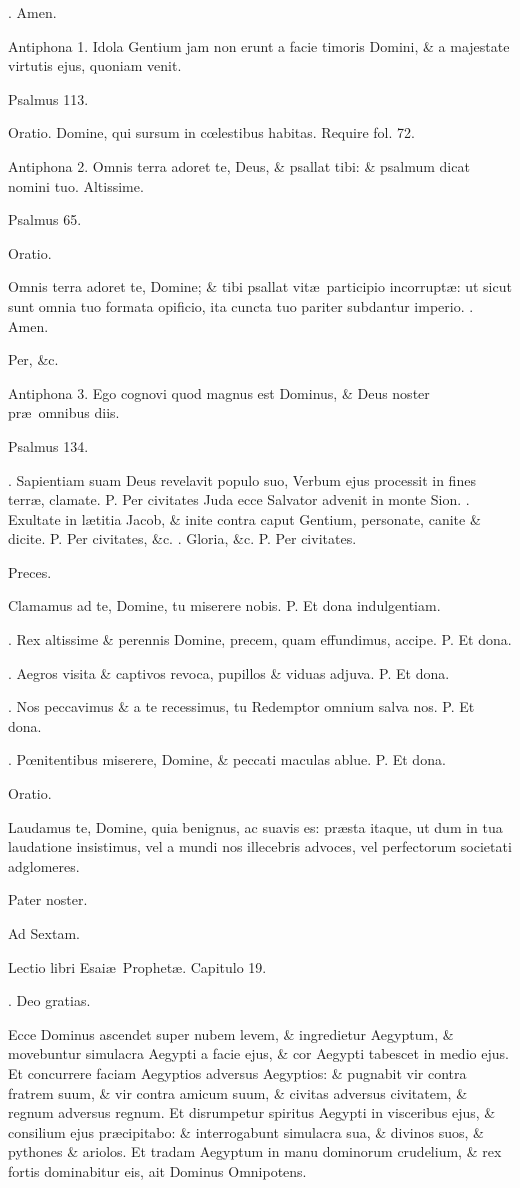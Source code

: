 \documentclass[letter,11pt]{book}
\makeatletter
\DeclareRobustCommand{\Vbar}{\vers@resp{-0.1em}{V}}
\DeclareRobustCommand{\Rbar}{\vers@resp{0pt}{R}}
\newcommand{\vers@resp@sym}{\raisebox{0.2ex}{\rotatebox[origin=c]{-20}{$\m@th\rceil$}}}
\newcommand{\vers@resp}[2]{%
  {\ooalign{\hidewidth\kern#1\vers@resp@sym\hidewidth\cr#2\cr}}%
}%
\def\P{\color{Red} P. \color{black}}
\def\V{\color{Red} \Vbar . \color{black}}
\def\R{\color{Red} \Rbar . \color{black}}
\makeatother
\begin{document}
\begin{multicols*}{2}
\R Amen.

Antiphona 1. Idola Gentium jam non erunt a facie timoris Domini, \& a majestate virtutis ejus, quoniam venit.

Psalmus 113.

Oratio. Domine, qui sursum in c\oe lestibus habitas. Require fol. 72.

Antiphona 2. Omnis terra adoret te, Deus, \& psallat tibi: \& psalmum dicat nomini tuo. Altissime.

Psalmus 65.

Oratio.

Omnis terra adoret te, Domine; \& tibi psallat vit\ae \ participio incorrupt\ae : ut sicut sunt omnia tuo formata opificio, ita cuncta tuo pariter subdantur imperio.
\R Amen.

Per, \&c.

Antiphona 3. Ego cognovi quod magnus est Dominus, \& Deus noster pr\ae \ omnibus diis.

Psalmus 134.

\R Sapientiam suam Deus revelavit populo suo, Verbum ejus processit in fines terr\ae , clamate. \P Per civitates Juda ecce Salvator advenit in monte Sion. \V Exultate in l\ae titia Jacob, \& inite contra caput Gentium, personate, canite \& dicite. \P Per civitates, \&c. \V Gloria, \&c. \P Per civitates.

Preces.

Clamamus ad te, Domine, tu miserere nobis.
\P Et dona indulgentiam.

\V Rex altissime \& perennis Domine, precem, quam effundimus, accipe.
\P Et dona.

\V Aegros visita \& captivos revoca, pupillos \& viduas adjuva.
\P Et dona.

\V Nos peccavimus \& a te recessimus, tu Redemptor omnium salva nos.
\P Et dona.

\V P\oe nitentibus miserere, Domine, \& peccati maculas ablue.
\P Et dona.

Oratio.

Laudamus te, Domine, quia benignus, ac suavis es: pr\ae sta itaque, ut dum in tua laudatione insistimus, vel a mundi nos illecebris advoces, vel perfectorum societati adglomeres.

Pater noster.

Ad Sextam.

Lectio libri Esai\ae \ Prophet\ae . Capitulo 19.

\R Deo gratias.

Ecce Dominus ascendet super nubem levem, \& ingredietur Aegyptum, \& movebuntur simulacra Aegypti a facie ejus, \& cor Aegypti tabescet in medio ejus. Et concurrere faciam Aegyptios adversus Aegyptios: \& pugnabit vir contra fratrem suum, \& vir contra amicum suum, \& civitas adversus civitatem, \& regnum adversus regnum. Et disrumpetur spiritus Aegypti in visceribus ejus, \& consilium ejus pr\ae cipitabo: \& interrogabunt simulacra sua, \& divinos suos, \& pythones \& ariolos. Et tradam Aegyptum in manu dominorum crudelium, \& rex fortis dominabitur eis, ait Dominus Omnipotens.


\end{multicols*}
\end{document}
